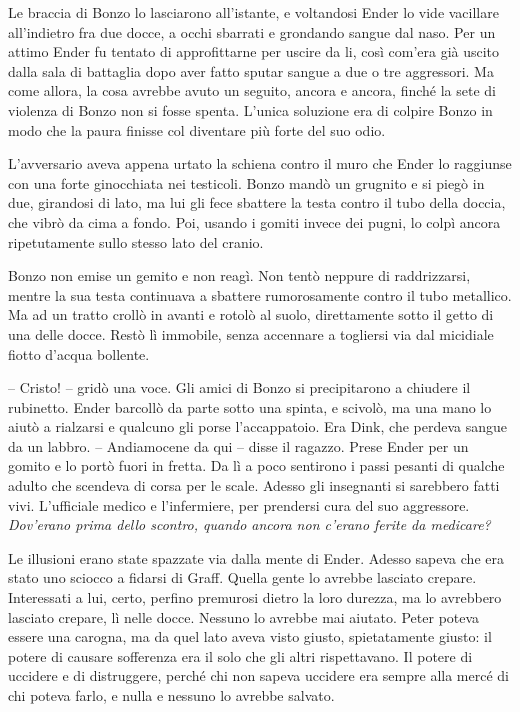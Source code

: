 {Le braccia di Bonzo lo lasciarono all'istante, e voltandosi Ender lo
	vide vacillare all'indietro fra due docce, a occhi sbarrati e grondando
	sangue dal naso. Per un attimo Ender fu tentato di approfittarne per
	uscire da li, così com'era già uscito dalla sala di battaglia dopo aver
	fatto sputar sangue a due o tre aggressori. Ma come allora, la cosa
	avrebbe avuto un seguito, ancora e ancora, finché la sete di violenza di
	Bonzo non si fosse spenta. L'unica soluzione era di colpire Bonzo in
	modo che la paura finisse col diventare più forte del suo odio.}

{L'avversario aveva appena urtato la schiena contro il muro che Ender lo
	raggiunse con una forte ginocchiata nei testicoli. Bonzo mandò un
	grugnito e si piegò in due, girandosi di lato, ma lui gli fece sbattere
	la testa contro il tubo della doccia, che vibrò da cima a fondo. Poi,
	usando i gomiti invece dei pugni, lo colpì ancora ripetutamente sullo
	stesso lato del cranio.}

{Bonzo non emise un gemito e non reagì. Non tentò neppure di
	raddrizzarsi, mentre la sua testa continuava a sbattere rumorosamente
	contro il tubo metallico. Ma ad un tratto crollò in avanti e rotolò al
	suolo, direttamente sotto il getto di una delle docce. Restò lì
	immobile, senza accennare a togliersi via dal micidiale fiotto d'acqua
	bollente.}

{-- Cristo! -- gridò una voce. Gli amici di Bonzo si precipitarono a
	chiudere il rubinetto. Ender barcollò da parte sotto una spinta, e
	scivolò, ma una mano lo aiutò a rialzarsi e qualcuno gli porse
	l'accappatoio. Era Dink, che perdeva sangue da un labbro. -- Andiamocene
	da qui -- disse il ragazzo. Prese Ender per un gomito e lo portò fuori
	in fretta. Da lì a poco sentirono i passi pesanti di qualche adulto che
	scendeva di corsa per le scale. Adesso gli insegnanti si sarebbero fatti
	vivi. L'ufficiale medico e l'infermiere, per prendersi cura del suo
	aggressore. \emph{Dov'erano prima dello scontro, quando ancora non
		c'erano ferite da medicare?}}

{Le illusioni erano state spazzate via dalla mente di Ender. Adesso
	sapeva che era stato uno sciocco a fidarsi di Graff. Quella gente lo
	avrebbe lasciato crepare. Interessati a lui, certo, perfino premurosi
	dietro la loro durezza, ma lo avrebbero lasciato crepare, lì nelle
	docce. Nessuno lo avrebbe mai aiutato. Peter poteva essere una carogna,
	ma da quel lato aveva visto giusto, spietatamente giusto: il potere di
	causare sofferenza era il solo che gli altri rispettavano. Il potere di
	uccidere e di distruggere, perché chi non sapeva uccidere era sempre
	alla mercé di chi poteva farlo, e nulla e nessuno lo avrebbe salvato.}

